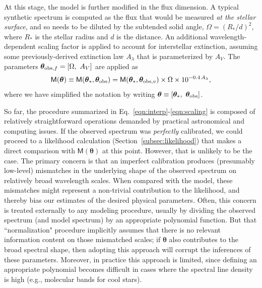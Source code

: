 \documentclass[iop,floatfix]{emulateapj}
\newcommand{\vt}{ {\bm \theta}}
\newcommand{\vM}{\mathsf{M}}
\newcommand{\vt}{ {\bm \theta}}
\begin{document}
At this stage, the model is further modified in the flux dimension.  A typical synthetic spectrum 
is computed as the flux that would be measured {\it at the stellar surface}, and so needs to be 
diluted by the subtended solid angle, $\Omega = (R_{\ast}/d)^2$, where $R_{\ast}$ is the stellar 
radius and $d$ is the distance.  An additional wavelength-dependent scaling factor is applied to 
account for interstellar extinction, assuming some previously-derived extinction law $A_{\lambda}$ 
\citep[e.g.,][]{cardelli89} that is parameterized by $A_V$.  The parameters $\vt_{{\rm obs}, f} = 
[\Omega, \,\, A_V]$ are applied as
\begin{equation}
\vM(\vt) \equiv \vM(\vt_{\ast}, \vt_{\rm obs}) = \vM(\vt_{\ast}, \vt_{{\rm obs}, v}) \times \Omega \times 10^{-0.4\,A_{\lambda}},
\label{eqn:scaling}
\end{equation}
where we have simplified the notation by writing $\vt \equiv [\vt_{\ast}, \,\, \vt_{\rm obs}]$.

So far, the procedure summarized in Eq.~\ref{eqn:interp}-\ref{eqn:scaling} is composed of 
relatively straightforward operations demanded by practical astronomical and computing issues.  If 
the observed spectrum was {\it perfectly} calibrated, we could proceed to a likelihood calculation 
(Section~\ref{subsec:likelihood}) that makes a direct comparison with $\vM(\vt)$ at this point.  
However, that is unlikely to be the case.  The primary concern is that an imperfect calibration 
produces (presumably low-level) mismatches in the underlying shape of the observed spectrum on 
relatively broad wavelength scales.  When compared with the model, these mismatches might represent 
a non-trivial contribution to the likelihood, and thereby bias our estimates of the desired 
physical parameters.  Often, this concern is treated externally to any modeling procedure, usually 
by dividing the observed spectrum (and model spectrum) by an appropriate polynomial function.  But 
that ``normalization" procedure implicitly assumes that there is no relevant information content on 
those mismatched scales; if $\vt$ also contributes to the broad spectral shape, then adopting this 
approach will corrupt the inferences of these parameters.  Moreover, in practice this approach is 
limited, since defining an appropriate polynomial becomes difficult in cases where the spectral 
line density is high (e.g., molecular bands for cool stars).  
\end{document}
